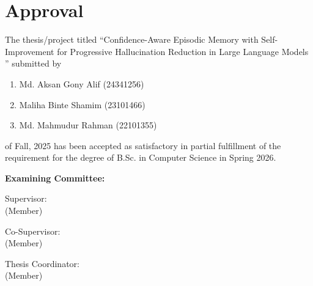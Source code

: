 \section*{Approval}

The thesis/project titled “Confidence-Aware Episodic Memory with Self-Improvement
for Progressive Hallucination Reduction in Large Language
Models ” submitted by 
\begin{enumerate}
  \item Md. Aksan Gony Alif (24341256)
  \item Maliha Binte Shamim (23101466)
  \item Md. Mahmudur Rahman (22101355) 
\end{enumerate}

of Fall, 2025 has been accepted as satisfactory in partial fulfillment of the requirement for the degree of B.Sc. in Computer Science in Spring 2026. 

\vspace{0.5cm}
\textbf{Examining Committee:}

\vspace{1cm}

\noindent Supervisor:\\
(Member)
\begin{center}
    \hspace{7cm}  \hspace{1cm}
\end{center}

\noindent Co-Supervisor:\\
(Member)
\begin{center}
    \hspace{7cm}  \hspace{1cm}
\end{center}


\noindent Thesis Coordinator:\\
(Member)
\begin{center}
    \hspace{7cm}  \hspace{1cm}
\end{center}

